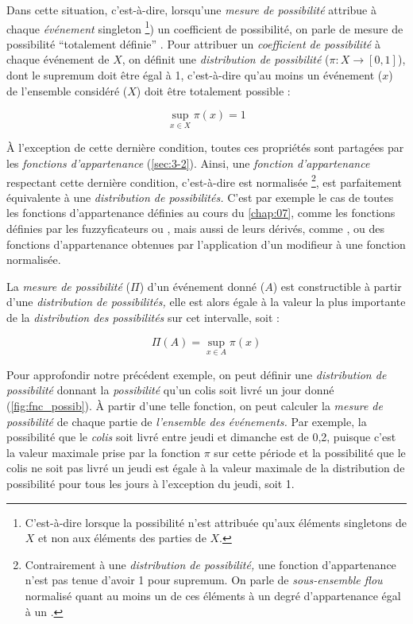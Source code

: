 Dans cette situation, c'est-à-dire, lorsqu'une \emph{mesure de
  possibilité} attribue à chaque \emph{événement} singleton
\footnote{C'est-à-dire lorsque la possibilité n'est attribuée qu'aux
  éléments singletons de \(X\) et non aux éléments des parties de
  \(X\).}) un coefficient de possibilité, on parle de mesure de
possibilité \enquote{totalement définie}
\autocite{Bouchon-Meunier2007}. Pour attribuer un \emph{coefficient de
  possibilité} à chaque événement de \(X\), on définit une
\emph{distribution de possibilité} (\(π : X → [0,1]\)), dont le
supremum doit être égal à 1, c'est-à-dire qu'au moins un événement
(\(x\)) de l'ensemble considéré (\(X\)) doit être totalement possible
:

\begin{equation}
  \sup_{x ∈ X}π(x)=1
\end{equation}

À l'exception de cette dernière condition, toutes ces propriétés sont
partagées par les \emph{fonctions d'appartenance}
(\autoref{sec:3-2}). Ainsi, une \emph{fonction d'appartenance}
respectant cette dernière condition, c'est-à-dire est normalisée
\footnote{Contrairement à une \emph{distribution de possibilité,} une
  fonction d'appartenance n'est pas tenue d'avoir 1 pour supremum. On
  parle de \emph{sous-ensemble flou} normalisé quant au moins un de
  ces éléments à un degré d’appartenance égal à un
  \autocite{Bouchon-Meunier2007}.}, est parfaitement équivalente à une
\emph{distribution de possibilités.} C'est par exemple le cas de
toutes les fonctions d'appartenance définies au cours du
\autoref{chap:07}, comme les fonctions définies par les fuzzyficateurs
 ou , mais aussi de leurs
dérivés, comme ,  ou
des fonctions d'appartenance obtenues par l’application d'un modifieur
à une fonction normalisée.

La \emph{mesure de possibilité} (\(\Pi\)) d'un événement donné (\(A\))
est constructible à partir d'une \emph{distribution de possibilités,}
elle est alors égale à la valeur la plus importante de la
\emph{distribution des possibilités} sur cet intervalle, soit :

\begin{equation}
  \Pi(A) = \sup_{x \in A}\pi(x)
\end{equation}

Pour approfondir notre précédent exemple, on peut définir une
\emph{distribution de possibilité} donnant la \emph{possibilité} qu'un
colis soit livré un jour donné (\autoref{fig:fnc_possib}). À partir
d'une telle fonction, on peut calculer la \emph{mesure de possibilité}
de chaque partie de \emph{l'ensemble des événements.} Par exemple, la
possibilité que le \emph{colis} soit livré entre jeudi et dimanche est
de 0,2, puisque c'est la valeur maximale prise par la fonction \(\pi\)
sur cette période et la possibilité que le colis ne soit pas livré un
jeudi est égale à la valeur maximale de la distribution de possibilité
pour tous les jours à l'exception du jeudi, soit 1.

